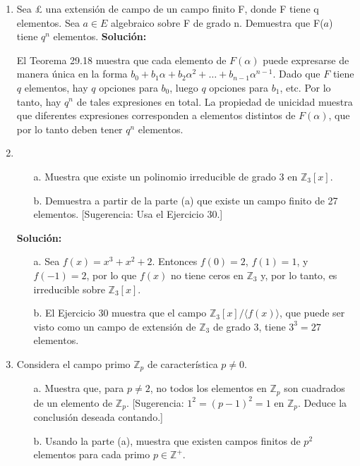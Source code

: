 \begin{enumerate}
    \item Sea £ una extensión de campo de un campo finito F, donde F tiene q elementos. Sea $a \in E$ algebraico sobre F de grado n. Demuestra que F($a$) tiene $q^n$ elementos.
     \textbf{Solución:}

     El Teorema 29.18 muestra que cada elemento de $F(\alpha)$ puede expresarse de manera única en la forma $b_0 + b_1\alpha + b_2\alpha^2 + \dots + b_{n-1}\alpha^{n-1}$. Dado que $F$ tiene $q$ elementos, hay $q$ opciones para $b_0$, luego $q$ opciones para $b_1$, etc. Por lo tanto, hay $q^n$ de tales expresiones en total. La propiedad de unicidad muestra que diferentes expresiones corresponden a elementos distintos de $F(\alpha)$, que por lo tanto deben tener $q^n$ elementos.

    \item 
    \begin{enumerate}
        \item[a.] Muestra que existe un polinomio irreducible de grado 3 en $\mathbb{Z}_3[x]$.
        \item[b.] Demuestra a partir de la parte (a) que existe un campo finito de 27 elementos. [Sugerencia: Usa el Ejercicio 30.]
    \end{enumerate}
    \textbf{Solución:}

    \begin{itemize}
        \item[a.] Sea $f(x) = x^3 + x^2 + 2$. Entonces $f(0) = 2$, $f(1) = 1$, y $f(-1) = 2$, por lo que $f(x)$ no tiene ceros en $\mathbb{Z}_3$ y, por lo tanto, es irreducible sobre $\mathbb{Z}_3[x]$.
        \item[b.] El Ejercicio 30 muestra que el campo $\mathbb{Z}_3[x]/\langle f(x) \rangle$, que puede ser visto como un campo de extensión de $\mathbb{Z}_3$ de grado 3, tiene $3^3 = 27$ elementos.
    \end{itemize}
    
    \item  Considera el campo primo $\mathbb{Z}_p$ de característica $p \neq 0$.
    \begin{enumerate}
        \item[a.] Muestra que, para $p \neq 2$, no todos los elementos en $\mathbb{Z}_p$ son cuadrados de un elemento de $\mathbb{Z}_p$. [Sugerencia: $1^2 = (p-1)^2 = 1$ en $\mathbb{Z}_p$. Deduce la conclusión deseada contando.]
        \item[b.] Usando la parte (a), muestra que existen campos finitos de $p^2$ elementos para cada primo $p \in \mathbb{Z}^+$.
    \end{enumerate}
    

\end{enumerate}
